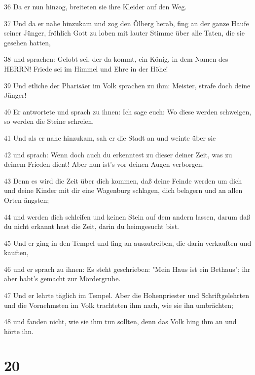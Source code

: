 \par 36 Da er nun hinzog, breiteten sie ihre Kleider auf den Weg.
\par 37 Und da er nahe hinzukam und zog den Ölberg herab, fing an der ganze Haufe seiner Jünger, fröhlich Gott zu loben mit lauter Stimme über alle Taten, die sie gesehen hatten,
\par 38 und sprachen: Gelobt sei, der da kommt, ein König, in dem Namen des HERRN! Friede sei im Himmel und Ehre in der Höhe!
\par 39 Und etliche der Pharisäer im Volk sprachen zu ihm: Meister, strafe doch deine Jünger!
\par 40 Er antwortete und sprach zu ihnen: Ich sage euch: Wo diese werden schweigen, so werden die Steine schreien.
\par 41 Und als er nahe hinzukam, sah er die Stadt an und weinte über sie
\par 42 und sprach: Wenn doch auch du erkenntest zu dieser deiner Zeit, was zu deinem Frieden dient! Aber nun ist's vor deinen Augen verborgen.
\par 43 Denn es wird die Zeit über dich kommen, daß deine Feinde werden um dich und deine Kinder mit dir eine Wagenburg schlagen, dich belagern und an allen Orten ängsten;
\par 44 und werden dich schleifen und keinen Stein auf dem andern lassen, darum daß du nicht erkannt hast die Zeit, darin du heimgesucht bist.
\par 45 Und er ging in den Tempel und fing an auszutreiben, die darin verkauften und kauften,
\par 46 und er sprach zu ihnen: Es steht geschrieben: "Mein Haus ist ein Bethaus"; ihr aber habt's gemacht zur Mördergrube.
\par 47 Und er lehrte täglich im Tempel. Aber die Hohenpriester und Schriftgelehrten und die Vornehmsten im Volk trachteten ihm nach, wie sie ihn umbrächten;
\par 48 und fanden nicht, wie sie ihm tun sollten, denn das Volk hing ihm an und hörte ihn.

\chapter{20}

